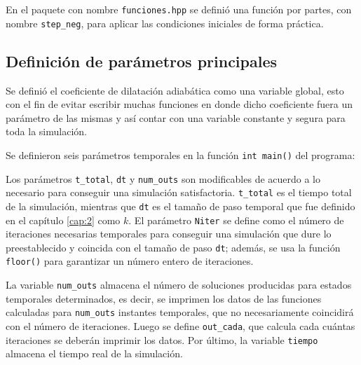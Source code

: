 En el paquete con nombre \texttt{funciones.hpp} se definió una función por partes, con nombre \texttt{step\_neg}, para aplicar las condiciones iniciales de forma práctica.



\subsection{Definición de parámetros principales}
Se definió el coeficiente de dilatación adiabática como una variable global, esto con el fin de evitar escribir muchas funciones en donde dicho coeficiente fuera un parámetro de las mismas y así contar con una variable constante y segura para toda la simulación.



Se definieron seis parámetros temporales en la función \texttt{int main()} del programa:


Los parámetros \texttt{t\_total}, \texttt{dt} y \texttt{num\_outs} son modificables de acuerdo a lo necesario para conseguir una simulación satisfactoria. \texttt{t\_total} es el tiempo total de la simulación, mientras que \texttt{dt} es el tamaño de paso temporal que fue definido en el capítulo \ref{cap:2} como $k$. El parámetro \texttt{Niter} se define como el número de iteraciones necesarias temporales para conseguir una simulación que dure lo preestablecido y coincida con el tamaño de paso \texttt{dt}; además, se usa la función \texttt{floor()} para garantizar un número entero de iteraciones. 

La variable \texttt{num\_outs} almacena el número de soluciones producidas para estados temporales determinados, es decir, se imprimen los datos de las funciones calculadas para \texttt{num\_outs} instantes temporales, que no necesariamente coincidirá con el número de iteraciones. Luego se define \texttt{out\_cada}, que calcula cada cuántas iteraciones se deberán imprimir los datos. Por último, la variable \texttt{tiempo} almacena el tiempo real de la simulación.

